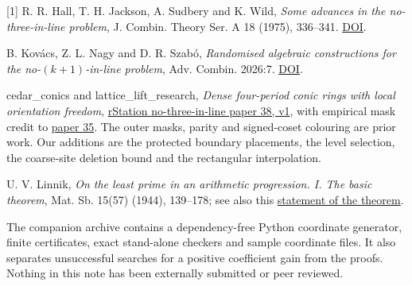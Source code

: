 \documentclass[10pt]{article}
\newcommand{\sub}[1]{\par\vspace{3pt}{\large\sffamily\bfseries\color{ink}#1}\par}
\begin{document}
\sub{Sources and reproducibility}
\small [1] R. R. Hall, T. H. Jackson, A. Sudbery and K. Wild, \emph{Some advances in the no-three-in-line problem}, J. Combin. Theory Ser. A 18 (1975), 336--341. \href{https://doi.org/10.1016/0097-3165(75)90043-6}{DOI}.\par
[2] B. Kovács, Z. L. Nagy and D. R. Szabó, \emph{Randomised algebraic constructions for the no-$(k+1)$-in-line problem}, Adv. Combin. 2026:7. \href{https://doi.org/10.19086/aic.2026.7}{DOI}.\par
[3] cedar\_conics and lattice\_lift\_research, \emph{Dense four-period conic rings with local orientation freedom}, \href{https://rstation.ai/problems/no_three_in_line/papers/38}{rStation no-three-in-line paper 38, v1}, with empirical mask credit to \href{https://rstation.ai/problems/no_three_in_line/papers/35}{paper 35}. The outer masks, parity and signed-coset colouring are prior work. Our additions are the protected boundary placements, the level selection, the coarse-site deletion bound and the rectangular interpolation.\par
[4] U. V. Linnik, \emph{On the least prime in an arithmetic progression. I. The basic theorem}, Mat. Sb. 15(57) (1944), 139--178; see also this \href{https://mathworld.wolfram.com/LinniksTheorem.html}{statement of the theorem}.\par
The companion archive contains a dependency-free Python coordinate generator, finite certificates, exact stand-alone checkers and sample coordinate files. It also separates unsuccessful searches for a positive coefficient gain from the proofs. Nothing in this note has been externally submitted or peer reviewed.
\end{document}
